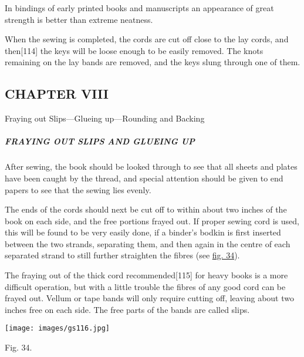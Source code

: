 \documentclass[
]{article}
\begin{document}
In bindings of early printed books and manuscripts an appearance of
great strength is better than extreme neatness.

When the sewing is completed, the cords are cut off close to the lay
cords, and then{\protect\hypertarget{Page_114}{}{{[}114{]}}} the keys
will be loose enough to be easily removed. The knots remaining on the
lay bands are removed, and the keys slung through one of them.

\hypertarget{chapter-viii}{%
\subsection[CHAPTER
VIII]{\texorpdfstring{\protect\hypertarget{CHAPTER_VIII}{}{}CHAPTER
VIII}{CHAPTER VIII}}\label{chapter-viii}}

Fraying out Slips---Glueing up---Rounding and Backing

\hypertarget{fraying-out-slips-and-glueing-up}{%
\subparagraph{FRAYING OUT SLIPS AND GLUEING
UP}\label{fraying-out-slips-and-glueing-up}}

{After} sewing, the book should be looked through to see that all sheets
and plates have been caught by the thread, and special attention should
be given to end papers to see that the sewing lies evenly.

The ends of the cords should next be cut off to within about two inches
of the book on each side, and the free portions frayed out. If proper
sewing cord is used, this will be found to be very easily done, if a
binder's bodkin is first inserted between the two strands, separating
them, and then again in the centre of each separated strand to still
further straighten the fibres (see \protect\hyperlink{Fig_34}{fig. 34}).

The fraying out of the thick cord
recommended{\protect\hypertarget{Page_115}{}{{[}115{]}}} for heavy books
is a more difficult operation, but with a little trouble the fibres of
any good cord can be frayed out. Vellum or tape bands will only require
cutting off, leaving about two inches free on each side. The free parts
of the bands are called slips.

\protect\hypertarget{Fig_34}{}{}
\texttt{[image: images/gs116.jpg]}

Fig. 34.
\end{document}
